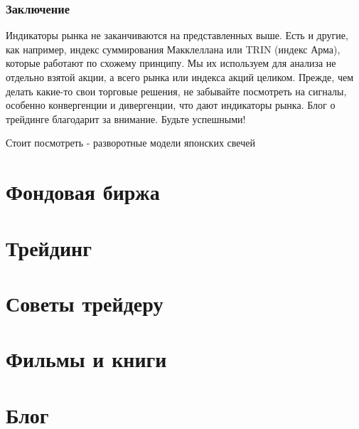 \documentclass[a5paper]{article}
\begin{document}
\subsubsection{Заключение}

Индикаторы рынка не заканчиваются на представленных выше. Есть и другие, как например, индекс суммирования Макклеллана или TRIN (индекс Арма), которые работают по схожему принципу. Мы их используем для анализа не отдельно взятой акции, а всего рынка или индекса акций целиком. Прежде, чем делать какие-то свои торговые решения, не забывайте посмотреть на сигналы, особенно конвергенции и дивергенции, что дают индикаторы рынка. Блог о трейдинге благодарит за внимание. Будьте успешными!


Стоит посмотреть - разворотные модели японских свечей


\section{Фондовая биржа}

\section{Трейдинг}

\section{Советы трейдеру}

\section{Фильмы и книги}

\section{Блог}
\end{document}
